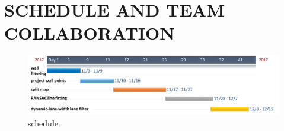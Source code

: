 \documentclass[letterpaper, 10 pt, conference]{ieeeconf}  %
\begin{document}
\section{SCHEDULE AND TEAM COLLABORATION}
\begin{figure}[h!] %
\includegraphics[width=1.0\columnwidth]{schedule.png}
\centering
\caption{schedule 
}
\end{figure}


\addtolength{\textheight}{-12cm}   %



\end{document}
